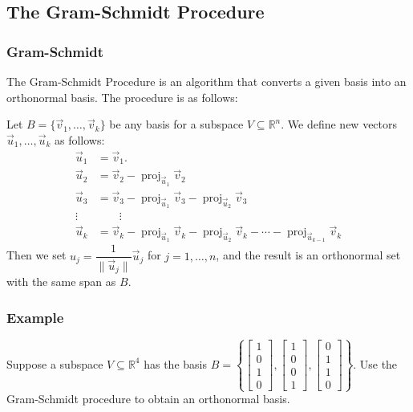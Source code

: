 \documentclass[11pt,t]{beamer}
\newcommand{\R}{\mathbb{R}}
\newcommand{\len}[1]{\lVert #1\rVert}
\begin{document}
\subsection{The Gram-Schmidt Procedure}
\begin{frame}\frametitle{Gram-Schmidt}
 The \alert{Gram-Schmidt Procedure} is an algorithm that converts a given basis into an orthonormal basis. The procedure is as follows:

Let $B=\{\vec{v}_1,\ldots, \vec{v}_k\}$ be any basis for a subspace $V\subseteq \R^n$. We define new vectors $\vec{u}_1,\ldots, \vec{u}_k$ as follows:
\begin{align*}
 \vec{u}_1 &= \vec{v}_1.\\
 \vec{u}_2 &= \vec{v}_2 - \operatorname{proj}_{\vec{u}_1}{\vec{v}_2}\\
 \vec{u}_3 &= \vec{v}_3 - \operatorname{proj}_{\vec{u}_1}{\vec{v}_3} - \operatorname{proj}_{\vec{u}_2}{\vec{v}_3}\\
 \vdots & \quad \quad \vdots\\
 \vec{u}_k &= \vec{v}_k - \operatorname{proj}_{\vec{u}_1}{\vec{v}_k} - \operatorname{proj}_{\vec{u}_2}{\vec{v}_k} - \cdots - \operatorname{proj}_{\vec{u}_{k-1}}{\vec{v}_k}
\end{align*}
Then we set $\hat{u}_j = \dfrac{1}{\len{\vec{u}_j}}\vec{u}_j$ for $j=1,\ldots, n$, and the result is an orthonormal set with the same span as $B$.
\end{frame}
\begin{frame}\frametitle{Example}
Suppose a subspace $V\subseteq \R^4$ has the basis  $B=\left\{\begin{bmatrix}1\\0\\1\\0\end{bmatrix},\begin{bmatrix}1\\0\\0\\1\end{bmatrix}, \begin{bmatrix}0\\1\\1\\0\end{bmatrix}\right\}$. Use the Gram-Schmidt procedure to obtain an orthonormal basis.
\end{frame}
\end{document}
